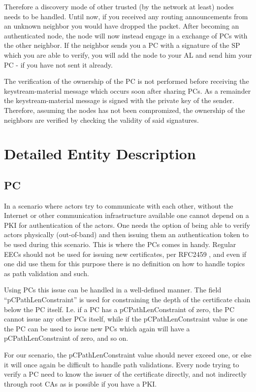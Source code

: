 Therefore a discovery mode of other trusted (by the network at least) nodes
needs to be handled. Until now, if you received any routing announcements
from an unknown neighbor you would have dropped the packet. After becoming an
authenticated node, the node will now instead engage in a exchange of \acp{PC}
with the other neighbor. If the neighbor sends you a \ac{PC} with a signature
of the \ac{SP} which you are able to verify, you will add the node to your
\ac{AL} and send him your \ac{PC} - if you have not sent it already.

The verification of the ownership of the \ac{PC} is not performed before
receiving the keystream-material message which occurs soon after sharing
\acp{PC}. As a remainder the keystream-material message is signed with the
private key of the sender. Therefore, assuming the nodes has not been
compromized, the ownership of the neighbors are verified by checking the
validity of said signatures.

\section{Detailed Entity Description}
\label{sect:detailed_ent}
\subsection{\acf{PC}}
\label{subsect:detailed_pc_descr}
In a scenario where actors try to communicate with each other, without the
Internet or other communication infrastructure available one cannot depend on a
\ac{PKI} for authentication of the actors. One needs the option of being able
to verify actors physically (out-of-band) and then issuing them an
authentication token to be used during this scenario. This is where the
\aclp{PC} comes in handy. Regular \acp{EEC} should not be used for issuing new
certificates, per RFC2459 \cite{rfc2459}, and even if one did use them for
this purpose there is no definition on how to handle topics as path validation
and such.

Using \acp{PC} this issue can be handled in a well-defined manner. The field
``pCPathLenConstraint'' is used for constraining the depth of the certificate
chain below the \ac{PC} itself. I.e. if a \ac{PC} has a pCPathLenConstraint of
zero, the \ac{PC} cannot issue any other \acp{PC} itself, while if the 
pCPathLenConstraint value is one the \ac{PC} can be used to issue new \acp{PC}
which again will have a pCPathLenConstraint of zero, and so on.

For our scenario, the pCPathLenConstraint value should never exceed one, or else
it will once again be difficult to handle path validations. Every node trying to
verify a \ac{PC} need to know the issuer of the certificate directly, and not
indirectly through root \acp{CA} as is possible if you have a \ac{PKI}.

